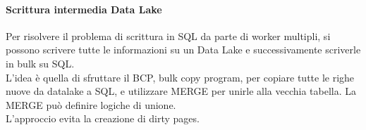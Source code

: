 \paragraph{Scrittura intermedia Data Lake}
Per risolvere il problema di scrittura in SQL da parte di worker multipli, si possono 
scrivere tutte le informazioni su un Data Lake e successivamente scriverle in bulk su SQL.\\
L'idea è quella di sfruttare il BCP, bulk copy program, per copiare tutte le righe nuove 
da datalake a SQL, e utilizzare MERGE per unirle alla vecchia tabella. La MERGE può definire 
logiche di unione.\\
L'approccio evita la creazione di dirty pages.